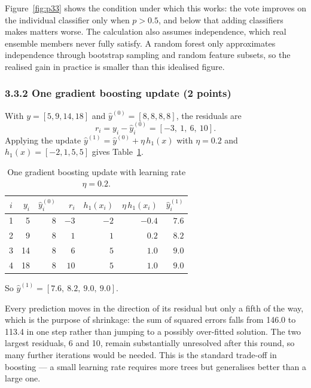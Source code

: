 \documentclass[11pt,a4paper]{article}
\begin{document}
Figure~\ref{fig:p33} shows the condition under which this works: the vote improves on the
individual classifier only when $p > 0.5$, and below that adding classifiers makes matters
worse. The calculation also assumes independence, which real ensemble members never fully
satisfy. A random forest only approximates independence through bootstrap sampling and
random feature subsets, so the realised gain in practice is smaller than this idealised
figure.

\subsubsection*{3.3.2 One gradient boosting update (2 points)}

With $y = [5, 9, 14, 18]$ and $\hat y^{(0)} = [8, 8, 8, 8]$, the residuals are
\[
r_i = y_i - \hat y^{(0)}_i = [-3,\ 1,\ 6,\ 10].
\]
Applying the update $\hat y^{(1)} = \hat y^{(0)} + \eta\, h_1(x)$ with $\eta = 0.2$ and
$h_1(x) = [-2, 1, 5, 5]$ gives Table~\ref{tab:boost}.

\begin{table}[H]
\centering
\caption{One gradient boosting update with learning rate $\eta = 0.2$.}
\label{tab:boost}
\begin{tabular}{crrrrrr}
\toprule
$i$ & $y_i$ & $\hat y^{(0)}_i$ & $r_i$ & $h_1(x_i)$ & $\eta\,h_1(x_i)$ & $\hat y^{(1)}_i$ \\
\midrule
1 & 5  & 8 & $-3$ & $-2$ & $-0.4$ & $\mathbf{7.6}$ \\
2 & 9  & 8 & $1$  & $1$  & $0.2$  & $\mathbf{8.2}$ \\
3 & 14 & 8 & $6$  & $5$  & $1.0$  & $\mathbf{9.0}$ \\
4 & 18 & 8 & $10$ & $5$  & $1.0$  & $\mathbf{9.0}$ \\
\bottomrule
\end{tabular}
\end{table}

So $\hat y^{(1)} = [7.6,\ 8.2,\ 9.0,\ 9.0]$.

Every prediction moves in the direction of its residual but only a fifth of the way, which
is the purpose of shrinkage: the sum of squared errors falls from 146.0 to 113.4 in one
step rather than jumping to a possibly over-fitted solution. The two largest residuals, 6
and 10, remain substantially unresolved after this round, so many further iterations would
be needed. This is the standard trade-off in boosting --- a small learning rate requires
more trees but generalises better than a large one.
\end{document}
